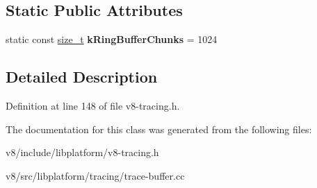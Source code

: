 \subsection*{Static Public Attributes}
\begin{DoxyCompactItemize}
\item 
\mbox{\label{classv8_1_1platform_1_1tracing_1_1TraceBuffer_a4957aae5f855daac2d581de0734f0d49}} 
static const \mbox{\hyperlink{classsize__t}{size\+\_\+t}} {\bfseries k\+Ring\+Buffer\+Chunks} = 1024
\end{DoxyCompactItemize}


\subsection{Detailed Description}


Definition at line 148 of file v8-\/tracing.\+h.



The documentation for this class was generated from the following files\+:\begin{DoxyCompactItemize}
\item 
v8/include/libplatform/v8-\/tracing.\+h\item 
v8/src/libplatform/tracing/trace-\/buffer.\+cc\end{DoxyCompactItemize}
